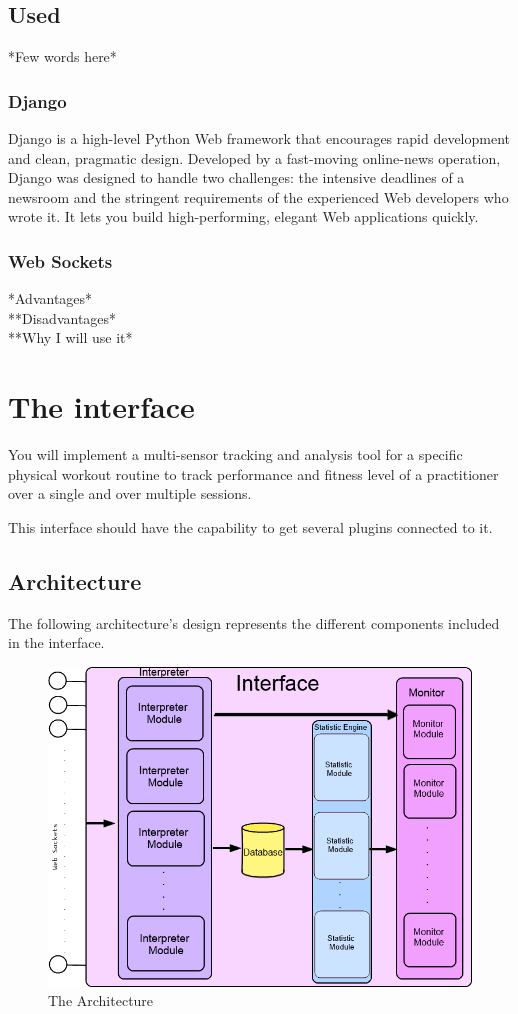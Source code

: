 \documentclass[a4paper]{article}
\begin{document}
\subsection{Used}
*Few words here*

\subsubsection{Django}
Django is a high-level Python Web framework that encourages rapid development and clean, pragmatic design. Developed by a fast-moving online-news operation, Django was designed to handle two challenges: the intensive deadlines of a newsroom and the stringent requirements of the experienced Web developers who wrote it. It lets you build high-performing, elegant Web applications quickly.

\subsubsection{Web Sockets}
*Advantages*
\\**Disadvantages*
\\**Why I will use it*

\section{The interface}
You will implement a multi-sensor tracking and analysis tool for a specific physical workout routine to track performance and fitness level of a practitioner over a single and over multiple sessions.

This interface should have the capability to get several plugins connected to it.

\subsection{Architecture}
The following architecture's design represents the different components included in the interface.
\newpage

\begin{figure}[h!]
\centering
\includegraphics[scale=0.6]{Interface.png}
\caption{The Architecture}
\label{threadsVsSync}
\end{figure}
\end{document}
